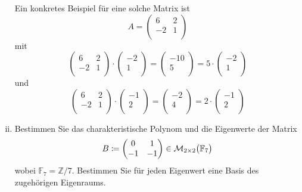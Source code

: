 \documentclass{scrreprt}
\begin{document}
\begin{enumerate}[(i)]
  Ein konkretes Beispiel für eine solche Matrix ist
  \[
    A = \begin{pmatrix}
      6 & 2 \\
      -2 & 1 \\
    \end{pmatrix}
  \]
  mit
  \[
    \begin{pmatrix}
      6 & 2 \\
      -2 & 1 \\
    \end{pmatrix} \cdot \begin{pmatrix}
      -2 \\
      1 \\
    \end{pmatrix} = \begin{pmatrix}
      -10 \\
      5 \\
    \end{pmatrix} = 5 \cdot \begin{pmatrix}
      -2 \\
      1 \\
    \end{pmatrix}
  \]
  und
  \[
    \begin{pmatrix}
      6 & 2 \\
      -2 & 1 \\
    \end{pmatrix} \cdot \begin{pmatrix}
      -1 \\
      2 \\
    \end{pmatrix} = \begin{pmatrix}
      -2 \\
      4 \\
    \end{pmatrix} = 2 \cdot \begin{pmatrix}
      -1 \\
      2 \\
    \end{pmatrix}
  \]

\item Bestimmen Sie das charakteristische Polynom und die Eigenwerte der
  Matrix
  \[
    B \coloneqq \begin{pmatrix}
      0 & 1 \\
      -1 & -1 \\
    \end{pmatrix} \in \mathcal{M}_{2 \times 2}\qty\big(\mathbb{F}_7)
  \]
  wobei $\mathbb{F}_7 = \mathbb{Z}/7$.
  Bestimmen Sie für jeden Eigenwert eine Basis des zugehörigen Eigenraums.


\end{enumerate}
\end{document}
